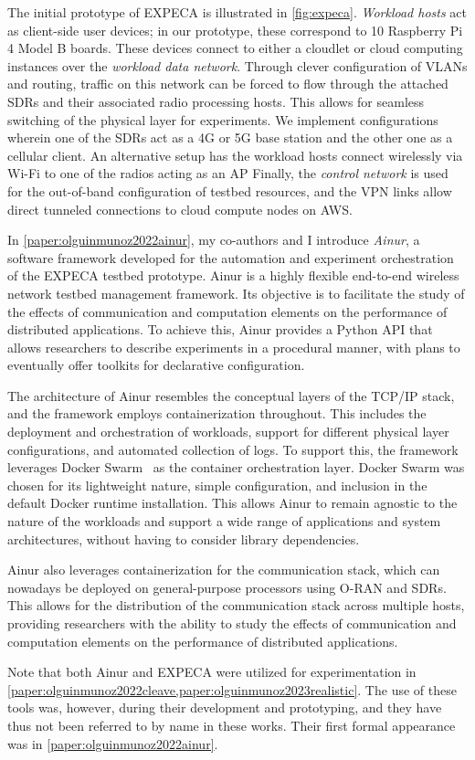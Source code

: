 The initial prototype of \gls{EXPECA} is illustrated in \cref{fig:expeca}.
\emph{Workload hosts} act as client-side user devices;
in our prototype, these correspond to \num{10} Raspberry Pi 4 Model B boards.
These devices connect to either a cloudlet or cloud computing instances over the \emph{workload data network}.
Through clever configuration of \acsp{VLAN} and routing, traffic on this network can be forced to flow through the attached \acsp{SDR} and their associated radio processing hosts.
This allows for seamless switching of the physical layer for experiments.
We implement configurations wherein one of the \glspl{SDR} act as a 4G or 5G base station and the other one as a cellular client.
An alternative setup has the workload hosts connect wirelessly via Wi-Fi to one of the radios acting as an \gls{AP}
Finally, the \emph{control network} is used for the out-of-band configuration of testbed resources, and the \acs{VPN} links allow direct tunneled connections to cloud compute nodes on \acs{AWS}.

In \cref{paper:olguinmunoz2022ainur}, my co-authors and I introduce \emph{Ainur}, a software framework developed for the automation and experiment orchestration of the \gls{EXPECA} testbed prototype.
Ainur is a highly flexible end-to-end wireless network testbed management framework.
Its objective is to facilitate the study of the effects of communication and computation elements on the performance of distributed applications.
To achieve this, Ainur provides a Python \gls{API} that allows researchers to describe experiments in a procedural manner, with plans to eventually offer toolkits for declarative configuration.

The architecture of Ainur resembles the conceptual layers of the \acs{TCP}/\acs{IP} stack, and the framework employs containerization throughout.
This includes the deployment and orchestration of workloads, support for different physical layer configurations, and automated collection of logs.
To support this, the framework leverages Docker Swarm~\cite{docker,merkel2014docker,Swarm2021} as the container orchestration layer.
Docker Swarm was chosen for its lightweight nature, simple configuration, and inclusion in the default Docker runtime installation.
This allows Ainur to remain agnostic to the nature of the workloads and support a wide range of applications and system architectures, without having to consider library dependencies.

Ainur also leverages containerization for the communication stack, which can nowadays be deployed on general-purpose processors using \gls{O-RAN} and \glspl{SDR}.
This allows for the distribution of the communication stack across multiple hosts, providing researchers with the ability to study the effects of communication and computation elements on the performance of distributed applications.

Note that both Ainur and \gls{EXPECA} were utilized for experimentation in \cref{paper:olguinmunoz2022cleave,paper:olguinmunoz2023realistic}.
The use of these tools was, however, during their development and prototyping, and they have thus not been referred to by name in these works.
Their first formal appearance was in \cref{paper:olguinmunoz2022ainur}.
